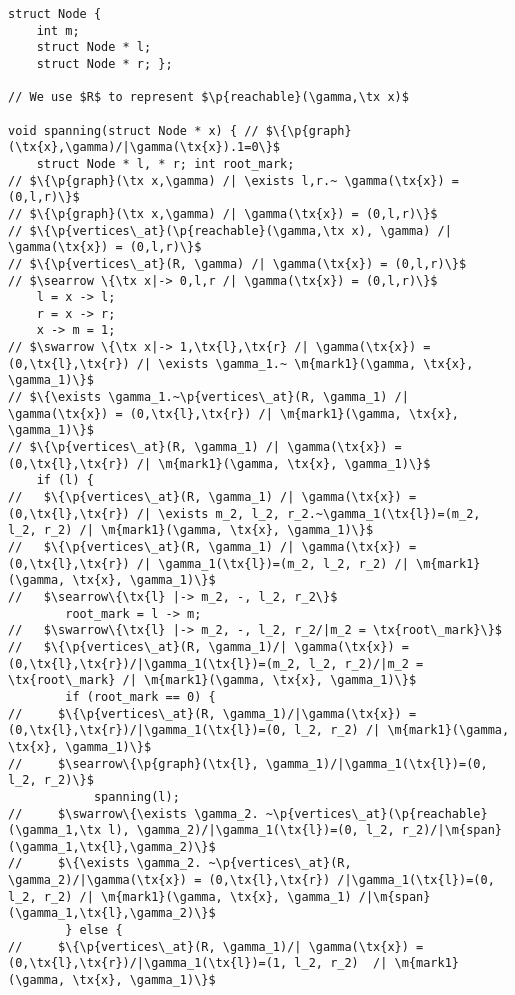 \begin{figure*}
  \begin{lstlisting}
struct Node {
    int m;
    struct Node * l;
    struct Node * r; };

// We use $R$ to represent $\p{reachable}(\gamma,\tx x)$

void spanning(struct Node * x) { // $\{\p{graph}(\tx{x},\gamma)/|\gamma(\tx{x}).1=0\}$
    struct Node * l, * r; int root_mark;
// $\{\p{graph}(\tx x,\gamma) /| \exists l,r.~ \gamma(\tx{x}) = (0,l,r)\}$
// $\{\p{graph}(\tx x,\gamma) /| \gamma(\tx{x}) = (0,l,r)\}$
// $\{\p{vertices\_at}(\p{reachable}(\gamma,\tx x), \gamma) /| \gamma(\tx{x}) = (0,l,r)\}$
// $\{\p{vertices\_at}(R, \gamma) /| \gamma(\tx{x}) = (0,l,r)\}$
// $\searrow \{\tx x|-> 0,l,r /| \gamma(\tx{x}) = (0,l,r)\}$
    l = x -> l;
    r = x -> r;
    x -> m = 1;
// $\swarrow \{\tx x|-> 1,\tx{l},\tx{r} /| \gamma(\tx{x}) = (0,\tx{l},\tx{r}) /| \exists \gamma_1.~ \m{mark1}(\gamma, \tx{x}, \gamma_1)\}$
// $\{\exists \gamma_1.~\p{vertices\_at}(R, \gamma_1) /| \gamma(\tx{x}) = (0,\tx{l},\tx{r}) /| \m{mark1}(\gamma, \tx{x}, \gamma_1)\}$
// $\{\p{vertices\_at}(R, \gamma_1) /| \gamma(\tx{x}) = (0,\tx{l},\tx{r}) /| \m{mark1}(\gamma, \tx{x}, \gamma_1)\}$
    if (l) {
//   $\{\p{vertices\_at}(R, \gamma_1) /| \gamma(\tx{x}) = (0,\tx{l},\tx{r}) /| \exists m_2, l_2, r_2.~\gamma_1(\tx{l})=(m_2, l_2, r_2) /| \m{mark1}(\gamma, \tx{x}, \gamma_1)\}$
//   $\{\p{vertices\_at}(R, \gamma_1) /| \gamma(\tx{x}) = (0,\tx{l},\tx{r}) /| \gamma_1(\tx{l})=(m_2, l_2, r_2) /| \m{mark1}(\gamma, \tx{x}, \gamma_1)\}$
//   $\searrow\{\tx{l} |-> m_2, -, l_2, r_2\}$
        root_mark = l -> m;
//   $\swarrow\{\tx{l} |-> m_2, -, l_2, r_2/|m_2 = \tx{root\_mark}\}$
//   $\{\p{vertices\_at}(R, \gamma_1)/| \gamma(\tx{x}) = (0,\tx{l},\tx{r})/|\gamma_1(\tx{l})=(m_2, l_2, r_2)/|m_2 = \tx{root\_mark} /| \m{mark1}(\gamma, \tx{x}, \gamma_1)\}$
        if (root_mark == 0) {
//     $\{\p{vertices\_at}(R, \gamma_1)/|\gamma(\tx{x}) = (0,\tx{l},\tx{r})/|\gamma_1(\tx{l})=(0, l_2, r_2) /| \m{mark1}(\gamma, \tx{x}, \gamma_1)\}$
//     $\searrow\{\p{graph}(\tx{l}, \gamma_1)/|\gamma_1(\tx{l})=(0, l_2, r_2)\}$
            spanning(l);
//     $\swarrow\{\exists \gamma_2. ~\p{vertices\_at}(\p{reachable}(\gamma_1,\tx l), \gamma_2)/|\gamma_1(\tx{l})=(0, l_2, r_2)/|\m{span}(\gamma_1,\tx{l},\gamma_2)\}$
//     $\{\exists \gamma_2. ~\p{vertices\_at}(R, \gamma_2)/|\gamma(\tx{x}) = (0,\tx{l},\tx{r}) /|\gamma_1(\tx{l})=(0, l_2, r_2) /| \m{mark1}(\gamma, \tx{x}, \gamma_1) /|\m{span}(\gamma_1,\tx{l},\gamma_2)\}$
        } else {
//     $\{\p{vertices\_at}(R, \gamma_1)/| \gamma(\tx{x}) = (0,\tx{l},\tx{r})/|\gamma_1(\tx{l})=(1, l_2, r_2)  /| \m{mark1}(\gamma, \tx{x}, \gamma_1)\}$

\end{lstlisting}
\end{figure*}
